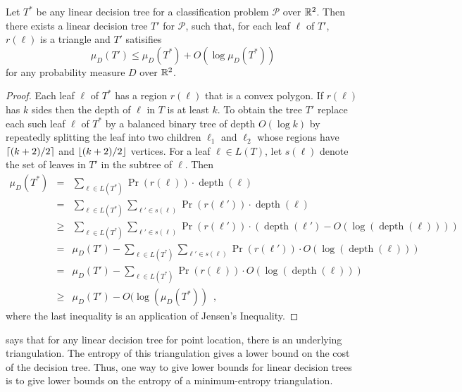 \documentclass[charterfonts,lotsofwhite]{patmorin}
\DeclareMathOperator{\depth}{depth}
\begin{document}
\begin{lem}
Let $T^*$ be any linear decision tree for a classification problem
$\mathcal{P}$ over $\mathbb{R}^2$.  Then there exists a linear decision tree
$T'$ for $\mathcal{P}$, such that, for each leaf $\ell$ of $T'$,
$r(\ell)$ is a triangle and $T'$ satisifies
\[
    \mu_D(T') \le \mu_D(T^*) + O(\log\mu_D(T^*))
\]
for any probability measure $D$ over $\mathbb{R}^2$.
\end{lem}

\begin{proof}
Each leaf $\ell$ of $T^*$ has a region $r(\ell)$ that is a convex
polygon.  If $r(\ell)$ has $k$ sides then the depth of $\ell$ in $T$
is at least $k$.  To obtain the tree $T'$ replace each such leaf
$\ell$ of $T^*$ by a balanced binary tree of depth $O(\log k)$ by
repeatedly splitting the leaf into two children $\ell_1$ and $\ell_2$
whose regions have $\left\lceil (k+2)/2 \right\rceil$ and $\left\lfloor (k+2)/2 \right\rfloor$ vertices.
For a leaf $\ell\in L(T)$, let $s(\ell)$ denote the set of leaves in $T'$
in the subtree of $\ell$.   Then
\begin{eqnarray*}
   \mu_D(T^*) 
     &  =  & \sum_{\ell\in L(T^*)} \Pr(r(\ell))\cdot \depth(\ell) \\
     &  =  & \sum_{\ell\in L(T^*)}\sum_{\ell'\in s(\ell)} 
              \Pr(r(\ell'))\cdot \depth(\ell) \\
     & \ge & \sum_{\ell\in L(T^*)} 
             \sum_{\ell'\in s(\ell)}\Pr(r(\ell'))\cdot (\depth(\ell')
                   - O(\log (\depth(\ell)))) \\
     &  =  & \mu_D(T') - \sum_{\ell\in L(T^*)} 
             \sum_{\ell'\in s(\ell)}\Pr(r(\ell'))\cdot O(\log (\depth(\ell))) \\
     &  =  & \mu_D(T') - \sum_{\ell\in L(T^*)} 
             \Pr(r(\ell))\cdot O(\log (\depth(\ell))) \\
     & \ge & \mu_D(T') - O(\log(\mu_D(T^*)) \enspace , 
\end{eqnarray*}
where the last inequality is an application of Jensen's Inequality.
\end{proof}

 says that for any linear decision tree for point
location, there is an underlying triangulation.  The entropy of this
triangulation gives a lower bound on the cost of the decision tree.
Thus, one way to give lower bounds for linear decision trees is to
give lower bounds on the entropy of a minimum-entropy triangulation.
\end{document}
